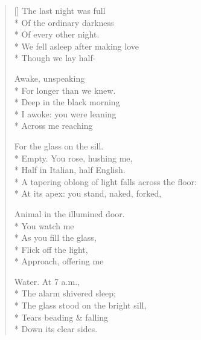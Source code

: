 \label{ch:last_night}
\settowidth{\versewidth}{A tapering oblong of light falls across the floor:}
\begin{verse}[\versewidth]
The last night was full\\*
Of the ordinary darkness\\*
Of every other night.\\*
We fell asleep after making love\\*
Though we lay half-

Awake, unspeaking\\*
For longer than we knew.\\*
Deep in the black morning\\*
I awoke: you were leaning\\*
Across me reaching

For the glass on the sill.\\*
Empty. You rose, hushing me,\\*
Half in Italian, half English.\\*
A tapering oblong of light falls across the floor:\\*
At its apex: you stand, naked, forked,

Animal in the illumined door.\\*
You watch me\\*
As you fill the glass,\\*
Flick off the light,\\*
Approach, offering me

Water. \hspace*{2\vgap} At 7 a.m.,\\*
The alarm shivered sleep;\\*
The glass stood on the bright sill,\\*
Tears beading \& falling\\*
Down its clear sides.
\end{verse}
